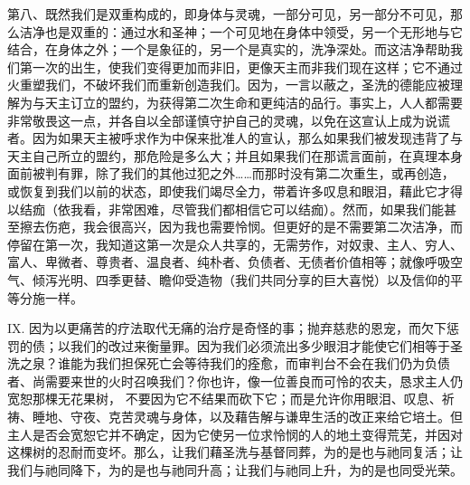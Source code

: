 第八、既然我们是双重构成的，即身体与灵魂，一部分可见，另一部分不可见，那么洁净也是双重的：通过水和圣神；一个可见地在身体中领受，另一个无形地与它结合，在身体之外；一个是象征的，另一个是真实的，洗净深处。而这洁净帮助我们第一次的出生，使我们变得更加而非旧，更像天主而非我们现在这样；它不通过火重塑我们，不破坏我们而重新创造我们。因为，一言以蔽之，圣洗的德能应被理解为与天主订立的盟约，为获得第二次生命和更纯洁的品行。事实上，人人都需要非常敬畏这一点，并各自以全部谨慎守护自己的灵魂，以免在这宣认上成为说谎者。因为如果天主被呼求作为中保来批准人的宣认，那么如果我们被发现违背了与天主自己所立的盟约，那危险是多么大；并且如果我们在那谎言面前，在真理本身面前被判有罪，除了我们的其他过犯之外……而那时没有第二次重生，或再创造，或恢复到我们以前的状态，即使我们竭尽全力，带着许多叹息和眼泪，藉此它才得以结痂（依我看，非常困难，尽管我们都相信它可以结痂）。然而，如果我们能甚至擦去伤疤，我会很高兴，因为我也需要怜悯。但更好的是不需要第二次洁净，而停留在第一次，我知道这第一次是众人共享的，无需劳作，对奴隶、主人、穷人、富人、卑微者、尊贵者、温良者、纯朴者、负债者、无债者价值相等；就像呼吸空气、倾泻光明、四季更替、瞻仰受造物（我们共同分享的巨大喜悦）以及信仰的平等分施一样。\par

IX. 因为以更痛苦的疗法取代无痛的治疗是奇怪的事；抛弃慈悲的恩宠，而欠下惩罚的债；以我们的改过来衡量罪。因为我们必须流出多少眼泪才能使它们相等于圣洗之泉？谁能为我们担保死亡会等待我们的痊愈，而审判台不会在我们仍为负债者、尚需要来世的火时召唤我们？你也许，像一位善良而可怜的农夫，恳求主人仍宽恕那棵无花果树， 不要因为它不结果而砍下它；而是允许你用眼泪、叹息、祈祷、睡地、守夜、克苦灵魂与身体，以及藉告解与谦卑生活的改正来给它培土。但主人是否会宽恕它并不确定，因为它使另一位求怜悯的人的地土变得荒芜，并因对这棵树的忍耐而变坏。那么，让我们藉圣洗与基督同葬，为的是也与祂同复活；让我们与祂同降下，为的是也与祂同升高；让我们与祂同上升，为的是也同受光荣。\par

